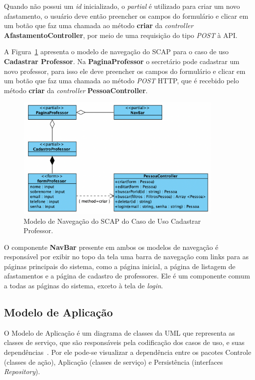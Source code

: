 Quando não possui um \textit{id} inicializado, o \textit{partial} é utilizado para criar um novo afastamento,
o usuário deve então preencher os campos do formulário e clicar em um botão que faz uma chamada ao método
\textbf{criar} da \textit{controller} \textbf{AfastamentoController}, por meio de uma requisição do tipo \textit{POST} à API.

A Figura~\ref{fig-modelo-navegacao-professor} apresenta o modelo de navegação do SCAP para o caso de uso
\textbf{Cadastrar Professor}. Na \textbf{PaginaProfessor} o secretário pode cadastrar um novo professor,
para isso ele deve preencher os campos do formulário e clicar em um botão que faz uma chamada ao método \textit{POST} HTTP,
que é recebido pelo método \textbf{criar} da \textit{controller} \textbf{PessoaController}.


\begin{figure}[h!]
	\centering
	\includegraphics[width=0.9\textwidth]{figuras/fig-modelo-naveg-cadast.png}
	\caption{Modelo de Navegação do SCAP do Caso de Uso Cadastrar Professor.}
	\label{fig-modelo-navegacao-professor}
\end{figure}

O componente \textbf{NavBar} presente em ambos os modelos de navegação é responsável por exibir
no topo da tela uma barra de navegação com links para as páginas principais do sistema, como a página inicial,
a página de listagem de afastamentos e a página de cadastro de professores. Ele é um componente
comum a todas as páginas do sistema, exceto à tela de \textit{login}.




\subsection{Modelo de Aplicação}
\label{subsec-frameweb-aplicacao}
O Modelo de Aplicação é um diagrama de classes da UML que representa as classes de
serviço, que são responsáveis pela codificação dos casos de uso, e suas dependências~\cite{souza:2007}.
Por ele pode-se visualizar a dependência entre os pacotes Controle (classes de ação),
Aplicação (classes de serviço) e Persistência (interfaces \textit{Repository}). 

